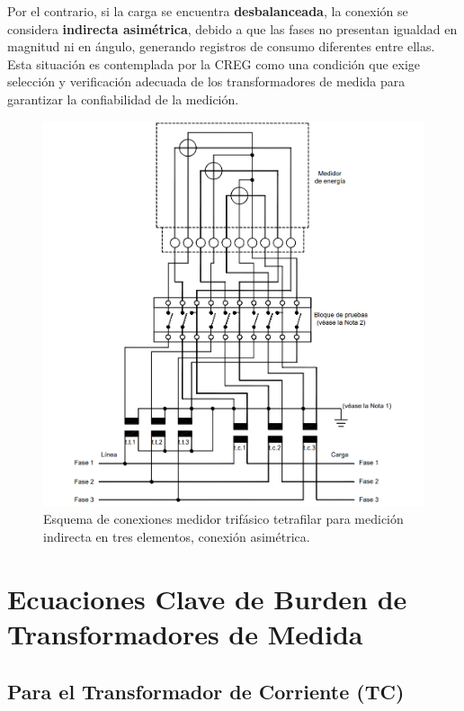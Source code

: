 Por el contrario, si la carga se encuentra \textbf{desbalanceada}, la conexión se considera \textbf{indirecta asimétrica}, debido a que las fases no presentan igualdad en magnitud ni en ángulo, generando registros de consumo diferentes entre ellas. Esta situación es contemplada por la CREG como una condición que exige selección y verificación adecuada de los transformadores de medida para garantizar la confiabilidad de la medición.

\begin{figure}[t]
    \centering
    \includegraphics[width=\columnwidth]{figs/figura_esquema_asimetrico.png}
    \caption{Esquema de conexiones medidor trifásico tetrafilar para medición indirecta en tres elementos, conexión asimétrica.}
    \label{fig:esquema_asimetrico}
\end{figure}



\section*{Ecuaciones Clave de Burden de Transformadores de Medida}

\subsection*{Para el Transformador de Corriente (TC)}

